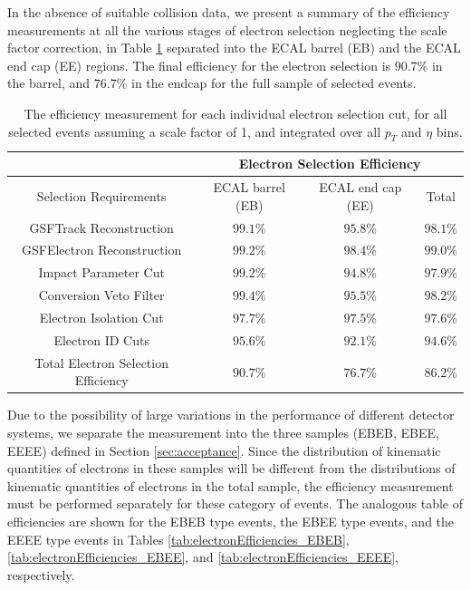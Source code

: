 \documentclass{cmspaper}
\begin{document}
In the absence of suitable collision data, we present a summary of the efficiency measurements at all the various stages of electron selection neglecting the scale factor correction, in Table \ref{tab:electronEfficiencies} separated into the ECAL barrel (EB) and the ECAL end cap (EE) regions. The final efficiency for the electron selection is $90.7\%$ in the barrel, and $76.7\%$ in the endcap for the full sample of selected events. 

\begin{table}[!ht]
\begin{center}
\begin{tabular}{|c|c|c|c|}
\hline
 & \multicolumn{3}{|c|}{Electron Selection Efficiency} \\
\hline
 Selection Requirements & ECAL barrel (EB) & ECAL end cap (EE) & Total \\
\hline
\hline
 GSFTrack Reconstruction             & $99.1\%$  & $95.8\%$ & $98.1\%$ \\
 GSFElectron Reconstruction          & $99.2\%$  & $98.4\%$ & $99.0\%$ \\
 Impact Parameter Cut                & $99.2\%$  & $94.8\%$ & $97.9\%$ \\
 Conversion Veto Filter              & $99.4\%$  & $95.5\%$ & $98.2\%$ \\
 Electron Isolation Cut              & $97.7\%$  & $97.5\%$ & $97.6\%$ \\
 Electron ID Cuts                    & $95.6\%$  & $92.1\%$ & $94.6\%$ \\
\hline                               
 Total Electron Selection Efficiency & $90.7\%$  & $76.7\%$ & $86.2\%$ \\
\hline
\end{tabular}
\caption{The efficiency measurement for each individual electron selection cut, for all selected \Z\To\Ep\Em events assuming a scale factor of 1, and integrated over all $p_{T}$ and $\eta$ bins. \label{tab:electronEfficiencies}}
\end{center}
\end{table}

Due to the possibility of large variations in the performance of different detector systems, we separate the measurement into the three samples (EBEB, EBEE, EEEE) defined in Section \ref{sec:acceptance}. Since the distribution of kinematic quantities of electrons in these samples will be different from the distributions of kinematic quantities of electrons in the total sample, the efficiency measurement must be performed separately for these category of events. The analogous table of efficiencies are shown for the EBEB type events, the EBEE type events, and the EEEE type events in Tables \ref{tab:electronEfficiencies_EBEB}, \ref{tab:electronEfficiencies_EBEE}, and \ref{tab:electronEfficiencies_EEEE}, respectively. 
\end{document}
